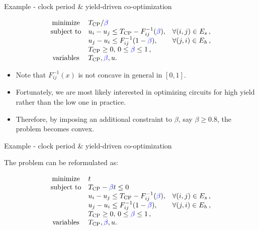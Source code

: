 \documentclass[
  ignorenonframetext,
  aspectratio=169,
  serif,onlymath]{beamer}
\providecommand{\tightlist}{%
  \setlength{\itemsep}{0pt}\setlength{\parskip}{0pt}}
\begin{document}
\begin{frame}{Example - clock period \& yield-driven co-optimization}
\protect\hypertarget{example---clock-period-yield-driven-co-optimization}{}

\[\begin{array}{cll}
   \text{minimize} &T_\text{CP} / {\color{blue}\beta} \\
   \text{subject to} & u_i - u_j \le T_\text{CP} - F_{ij}^{-1}({\color{blue}\beta}), & \forall (i,j) \in E_s \,,\\
                     & u_j - u_i \le F_{ij}^{-1}(1 - {\color{blue}\beta}), & \forall (j,i) \in E_h \,, \\
                     & T_\text{CP} \ge 0, \, 0 \le {\color{blue}\beta} \le 1 \, , \\
    \text{variables} &T_\text{CP}, {\color{blue}\beta}, u.
   \end{array}\]

\begin{itemize}
\tightlist
\item
  Note that \(F_{ij}^{-1}(x)\) is not concave in general in \([0, 1]\).
\item
  Fortunately, we are most likely interested in optimizing circuits for
  high yield rather than the low one in practice.
\item
  Therefore, by imposing an additional constraint to \(\beta\), say
  \(\beta \ge 0.8\), the problem becomes convex.
\end{itemize}

\end{frame}

\begin{frame}{Example - clock period \& yield-driven co-optimization}
\protect\hypertarget{example---clock-period-yield-driven-co-optimization-1}{}

The problem can be reformulated as:

\[\begin{array}{cll}
   \text{minimize}   & t \\
   \text{subject to} & T_\text{CP} - {\color{blue}\beta} t \le 0\\
                     & u_i - u_j \le T_\text{CP} - F_{ij}^{-1}({\color{blue}\beta}), & \forall (i,j) \in E_s \,,\\
                     & u_j - u_i \le F_{ij}^{-1}(1 - {\color{blue}\beta}), & \forall (j,i) \in E_h \,, \\
                     & T_\text{CP} \ge 0, \, 0 \le {\color{blue}\beta} \le 1 \, , \\
    \text{variables} &T_\text{CP}, {\color{blue}\beta}, u.
   \end{array}\]

\end{frame}
\end{document}
